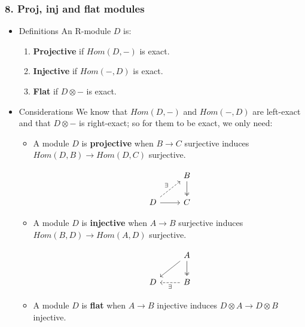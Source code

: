\documentclass[11pt]{article}
\begin{document}
\subsubsection*{8. Proj, inj and flat modules}
\label{sec-3-2-3}
\begin{itemize}
\item Definitions
\label{sec-3-2-3-1}
An R-module $D$ is:

\begin{enumerate}
\item \textbf{Projective} if $Hom(D, -)$ is exact.
\item \textbf{Injective} if $Hom(-,D)$ is exact.
\item \textbf{Flat} if $D \otimes -$ is exact.
\end{enumerate}

\item Considerations
\label{sec-3-2-3-2}
We know that $Hom(D,-)$ and $Hom(-,D)$ are left-exact and that
$D\otimes -$ is right-exact; so for them to be exact, we only need:

\begin{itemize}
\item A module $D$ is \textbf{projective} when $B \longrightarrow C$ surjective induces
$Hom(D,B) \longrightarrow Hom(D,C)$ surjective.

\[ \begin{tikzcd}
               & B \dar[two heads] \\
   D \rar\urar[dashed]{\exists} & C
   \end{tikzcd} \]

\item A module $D$ is \textbf{injective} when $A \longrightarrow B$ surjective induces
$Hom(B,D) \longrightarrow Hom(A,D)$ surjective.

\[ \begin{tikzcd}
     & A \dar[two heads]\dlar \\
   D & B \lar[dashed]{\exists}
   \end{tikzcd} \]

\item A module $D$ is \textbf{flat} when $A \longrightarrow B$ injective induces 
$D\otimes A \longrightarrow D \otimes B$ injective.
\end{itemize}
\end{itemize}
\end{document}
